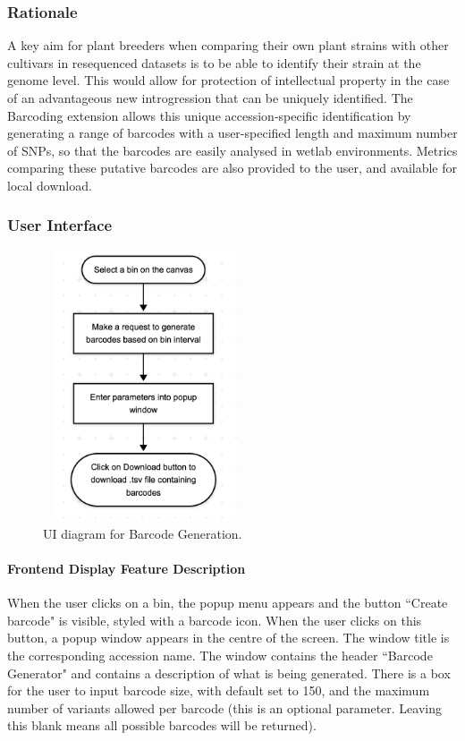 \documentclass[12pt]{article}
\begin{document}
\subsubsection{Rationale}
A key aim for plant breeders when comparing their own plant strains with other cultivars in resequenced datasets is to be able to identify their strain at the genome level. This would allow for protection of intellectual property in the case of an advantageous new introgression that can be uniquely identified. The Barcoding extension allows this unique accession-specific identification by generating a range of barcodes with a user-specified length and maximum number of SNPs, so that the barcodes are easily analysed in wetlab environments. Metrics comparing these putative barcodes are also provided to the user, and available for local download. 

\subsubsection{User Interface}

\begin{figure}[h]
    \centering
    \includegraphics[width=6cm, height=8cm]{Bar1.png}
    \caption{UI diagram for Barcode Generation.}
\end{figure}


\paragraph{Frontend Display Feature Description}
When the user clicks on a bin, the popup menu appears and the button ``Create barcode" is visible, styled with a barcode icon. When the user clicks on this button, a popup window appears in the centre of the screen. The window title is the corresponding accession name. The window contains the header ``Barcode Generator" and contains a description of what is being generated. There is a box for the user to input barcode size, with default set to 150, and the maximum number of variants allowed per barcode (this is an optional parameter. Leaving this blank means all possible barcodes will be returned).  
\end{document}
